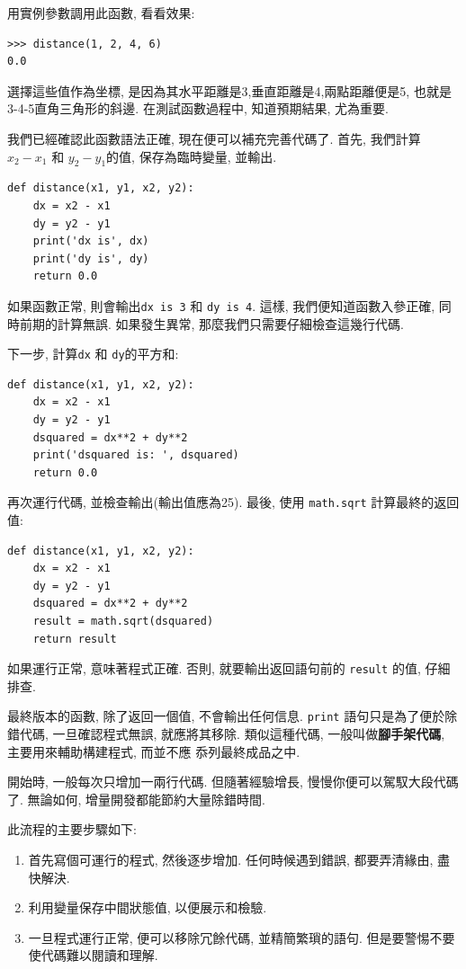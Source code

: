 \documentclass[10pt]{book}
\begin{document}
用實例參數調用此函數, 看看效果:

\begin{verbatim}
>>> distance(1, 2, 4, 6)
0.0
\end{verbatim}
%
選擇這些值作為坐標, 是因為其水平距離是3,垂直距離是4,兩點距離便是5, 
也就是3-4-5直角三角形的斜邊. 
在測試函數過程中, 知道預期結果, 尤為重要. 

我們已經確認此函數語法正確, 現在便可以補充完善代碼了. 
首先, 我們計算$x_2 - x_1$ 和 $y_2 - y_1$的值, 保存為臨時變量, 並輸出. 

\begin{verbatim}
def distance(x1, y1, x2, y2):
    dx = x2 - x1
    dy = y2 - y1
    print('dx is', dx)
    print('dy is', dy)
    return 0.0
\end{verbatim}
%
如果函數正常, 則會輸出\verb"dx is 3" 和 \verb"dy is 4". 
這樣, 我們便知道函數入參正確, 同時前期的計算無誤. 
如果發生異常, 那麼我們只需要仔細檢查這幾行代碼. 

下一步, 計算{\tt dx} 和 {\tt dy}的平方和:

\begin{verbatim}
def distance(x1, y1, x2, y2):
    dx = x2 - x1
    dy = y2 - y1
    dsquared = dx**2 + dy**2
    print('dsquared is: ', dsquared)
    return 0.0
\end{verbatim}
%
再次運行代碼, 並檢查輸出(輸出值應為25). 
最後, 使用 {\tt math.sqrt} 計算最終的返回值:

\begin{verbatim}
def distance(x1, y1, x2, y2):
    dx = x2 - x1
    dy = y2 - y1
    dsquared = dx**2 + dy**2
    result = math.sqrt(dsquared)
    return result
\end{verbatim}
%
如果運行正常, 意味著程式正確. 
否則, 就要輸出返回語句前的 {\tt result} 的值, 仔細排查. 

最終版本的函數, 除了返回一個值, 不會輸出任何信息. 
{\tt print} 語句只是為了便於除錯代碼, 一旦確認程式無誤, 就應將其移除. 
類似這種代碼, 一般叫做{\bf 腳手架代碼},  主要用來輔助構建程式, 而並不應
忝列最終成品之中. 

開始時, 一般每次只增加一兩行代碼. 但隨著經驗增長, 慢慢你便可以駕馭大段代碼了. 
無論如何, 增量開發都能節約大量除錯時間.

此流程的主要步驟如下:

\begin{enumerate}

\item 首先寫個可運行的程式, 然後逐步增加. 任何時候遇到錯誤, 都要弄清緣由, 盡快解決. 

\item 利用變量保存中間狀態值, 以便展示和檢驗. 

\item 一旦程式運行正常, 便可以移除冗餘代碼, 並精簡繁瑣的語句. 
但是要警惕不要使代碼難以閱讀和理解. 

\end{enumerate}
\end{document}
